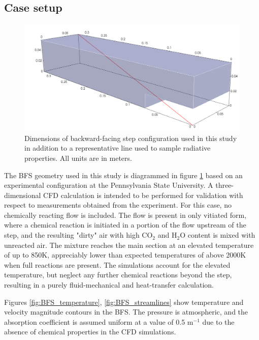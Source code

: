 \subsection{Case setup}
\begin{figure}
\includegraphics[width=\linewidth]{figures/ch4/BFS_visual.png}
\caption{Dimensions of backward-facing step configuration used in this study in addition to a representative line used to sample radiative properties. All units are in meters. }
\label{fig:BFS_geometry}
\end{figure}

The BFS geometry used in this study is diagrammed in figure \ref{fig:BFS_geometry} based on an experimental configuration at the Pennsylvania State University.
A three-dimensional CFD calculation is intended to be performed for validation with respect to measurements obtained from the experiment. For this case, no chemically reacting flow is included. 
The flow is present in only vitiated form, where a chemical reaction is initiated in a portion of the flow upstream of the step, and the resulting "dirty" air with high CO$_2$ and H$_2$O content is mixed with unreacted air. 
The mixture reaches the main section at an elevated temperature of up to 850K, appreciably lower than expected temperatures of above 2000K when full reactions are present. 
The simulations account for the elevated temperature, but neglect any further chemical reactions beyond the step, resulting in a purely fluid-mechanical and heat-transfer calculation.

Figures \ref{fig:BFS_temperature}, \ref{fig:BFS_streamlines} show temperature and velocity magnitude contours in the BFS. The pressure is atmospheric, and the absorption coefficient is assumed uniform at a value of 0.5 m$^{-1}$ due to the absence of chemical properties in the CFD simulations.

